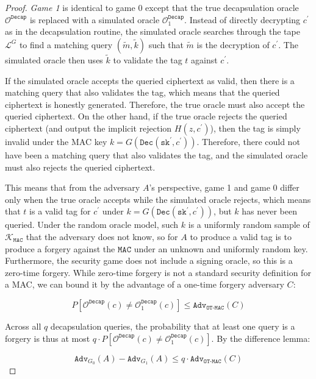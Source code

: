 \documentclass[floatrow,journal=tches,submission]{iacrtrans}
\newcommand{\decrypt}{\texttt{Dec}}
\newcommand{\decap}{\texttt{Decap}}
\newcommand{\mac}{\texttt{MAC}}
\newcommand{\sk}{\texttt{sk}}
\newcommand{\adv}{\texttt{Adv}}
\begin{document}
\begin{proof}
    \emph{Game 1} is identical to game 0 except that the true decapsulation oracle $\mathcal{O}^\decap$ is replaced with a simulated oracle $\mathcal{O}^\decap_1$. Instead of directly decrypting $c^\prime$ as in the decapsulation routine, the simulated oracle searches through the tape $\mathcal{L}^G$ to find a matching query $(\tilde{m}, \tilde{k})$ such that $\tilde{m}$ is the decryption of $c^\prime$. The simulated oracle then uses $\tilde{k}$ to validate the tag $t$ against $c^\prime$.

    If the simulated oracle accepts the queried ciphertext as valid, then there is a matching query that also validates the tag, which means that the queried ciphertext is honestly generated. Therefore, the true oracle must also accept the queried ciphertext. On the other hand, if the true oracle rejects the queried ciphertext (and output the implicit rejection $H(z, c^\prime)$), then the tag is simply invalid under the MAC key $k = G(\decrypt(\sk^\prime, c^\prime))$. Therefore, there could not have been a matching query that also validates the tag, and the simulated oracle must also rejects the queried ciphertext.

    This means that from the adversary $A$'s perspective, game 1 and game 0 differ only when the true oracle accepts while the simulated oracle rejects, which means that $t$ is a valid tag for $c^\prime$ under $k = G(\decrypt(\sk^\prime, c^\prime))$, but $k$ has never been queried. Under the random oracle model, such $k$ is a uniformly random sample of $\mathcal{K}_\mac$ that the adversary does not know, so for $A$ to produce a valid tag is to produce a forgery against the $\mac$ under an unknown and uniformly random key. Furthermore, the security game does not include a signing oracle, so this is a zero-time forgery. While zero-time forgery is not a standard security definition for a MAC, we can bound it by the advantage of a one-time forgery adversary $C$:

    \begin{equation*}
        P\left[\mathcal{O}^\decap(c) \neq \mathcal{O}^\decap_1(c)\right]
        \leq \adv_\texttt{OT-MAC}(C)
    \end{equation*}

    Across all $q$ decapsulation queries, the probability that at least one query is a forgery is thus at most $q \cdot P\left[\mathcal{O}^\decap(c) \neq \mathcal{O}^\decap_1(c)\right]$. By the difference lemma:

    \begin{equation*}
        \adv_{G_0}(A) - \adv_{G_1}(A) \leq q\cdot  \adv_\texttt{OT-MAC}(C)
    \end{equation*}


\end{proof}
\end{document}
